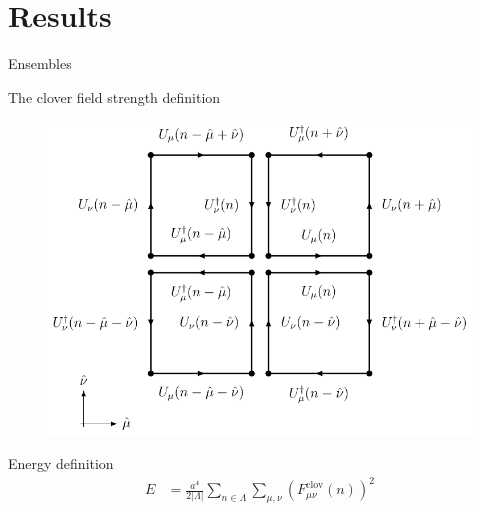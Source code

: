 \documentclass[10pt,show notes on second screen]{beamer}
\begin{document}
\section{Results}

\begin{frame}{Ensembles}
\end{frame}

\begin{frame}{The clover field strength definition}
\begin{figure}[h!tb]
    \centering
    \includegraphics[scale=0.7]{../figures/illustrations/lqcd/clover/clover}
\end{figure}
\end{frame}

\begin{frame}{Energy definition}
\begin{align*}
    E &= \frac{a^4}{2|\Lambda|} \sum_{n\in\Lambda}\sum_{\mu,\nu} \left(F^\mathrm{clov}_{\mu\nu}(n)\right)^2 \\
\end{align*}
\end{frame}
\end{document}
